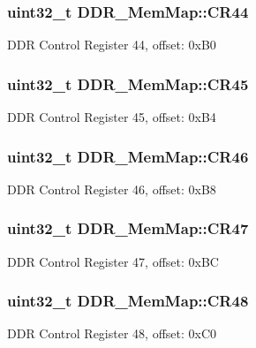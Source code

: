 \subsubsection[{C\+R44}]{\setlength{\rightskip}{0pt plus 5cm}uint32\+\_\+t D\+D\+R\+\_\+\+Mem\+Map\+::\+C\+R44}\label{struct_d_d_r___mem_map_a7147d871f78c6c242c79ca0e102c51b9}
D\+D\+R Control Register 44, offset\+: 0x\+B0 \hypertarget{struct_d_d_r___mem_map_a29dd1d24e46fdd89739d26211861e1e6}{}
\subsubsection[{C\+R45}]{\setlength{\rightskip}{0pt plus 5cm}uint32\+\_\+t D\+D\+R\+\_\+\+Mem\+Map\+::\+C\+R45}\label{struct_d_d_r___mem_map_a29dd1d24e46fdd89739d26211861e1e6}
D\+D\+R Control Register 45, offset\+: 0x\+B4 \hypertarget{struct_d_d_r___mem_map_a39e43e095bcede35c4bf025dece20143}{}
\subsubsection[{C\+R46}]{\setlength{\rightskip}{0pt plus 5cm}uint32\+\_\+t D\+D\+R\+\_\+\+Mem\+Map\+::\+C\+R46}\label{struct_d_d_r___mem_map_a39e43e095bcede35c4bf025dece20143}
D\+D\+R Control Register 46, offset\+: 0x\+B8 \hypertarget{struct_d_d_r___mem_map_affcaa1a1fc60df475d41eee8c511bd4a}{}
\subsubsection[{C\+R47}]{\setlength{\rightskip}{0pt plus 5cm}uint32\+\_\+t D\+D\+R\+\_\+\+Mem\+Map\+::\+C\+R47}\label{struct_d_d_r___mem_map_affcaa1a1fc60df475d41eee8c511bd4a}
D\+D\+R Control Register 47, offset\+: 0x\+B\+C \hypertarget{struct_d_d_r___mem_map_aea2f4bcde83a5347f56ff5073922931c}{}
\subsubsection[{C\+R48}]{\setlength{\rightskip}{0pt plus 5cm}uint32\+\_\+t D\+D\+R\+\_\+\+Mem\+Map\+::\+C\+R48}\label{struct_d_d_r___mem_map_aea2f4bcde83a5347f56ff5073922931c}
D\+D\+R Control Register 48, offset\+: 0x\+C0 \hypertarget{struct_d_d_r___mem_map_a9d7a9a367fa4fadd78b50661daf91952}{}
